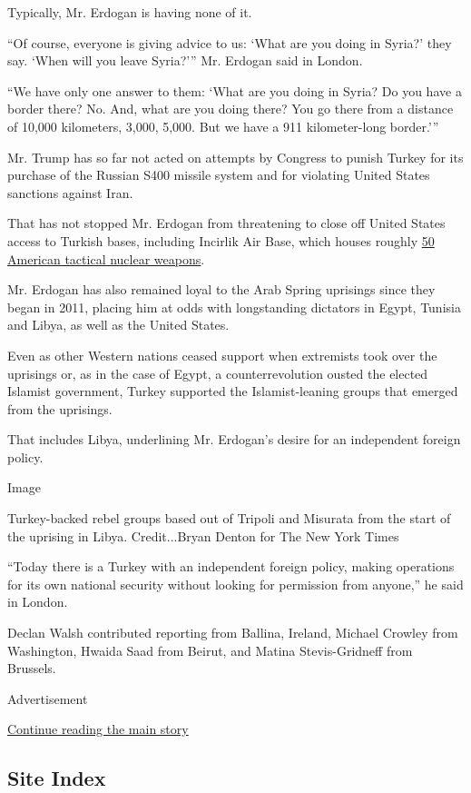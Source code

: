 Typically, Mr. Erdogan is having none of it.

``Of course, everyone is giving advice to us: `What are you doing in
Syria?' they say. `When will you leave Syria?''' Mr. Erdogan said in
London.

``We have only one answer to them: `What are you doing in Syria? Do you
have a border there? No. And, what are you doing there? You go there
from a distance of 10,000 kilometers, 3,000, 5,000. But we have a 911
kilometer-long border.'''

Mr. Trump has so far not acted on attempts by Congress to punish Turkey
for its purchase of the Russian S400 missile system and for violating
United States sanctions against Iran.

That has not stopped Mr. Erdogan from threatening to close off United
States access to Turkish bases, including Incirlik Air Base, which
houses roughly
\href{https://www.nytimes.com/2019/10/14/world/middleeast/trump-turkey-syria.html}{50
American tactical nuclear weapons}.

Mr. Erdogan has also remained loyal to the Arab Spring uprisings since
they began in 2011, placing him at odds with longstanding dictators in
Egypt, Tunisia and Libya, as well as the United States.

Even as other Western nations ceased support when extremists took over
the uprisings or, as in the case of Egypt, a counterrevolution ousted
the elected Islamist government, Turkey supported the Islamist-leaning
groups that emerged from the uprisings.

That includes Libya, underlining Mr. Erdogan's desire for an independent
foreign policy.

Image

Turkey-backed rebel groups based out of Tripoli and Misurata from the
start of the uprising in Libya. Credit...Bryan Denton for The New York
Times

``Today there is a Turkey with an independent foreign policy, making
operations for its own national security without looking for permission
from anyone,'' he said in London.

Declan Walsh contributed reporting from Ballina, Ireland, Michael
Crowley from Washington, Hwaida Saad from Beirut, and Matina
Stevis-Gridneff from Brussels.

Advertisement

\protect\hyperlink{after-bottom}{Continue reading the main story}

\hypertarget{site-index}{%
\subsection{Site Index}\label{site-index}}

